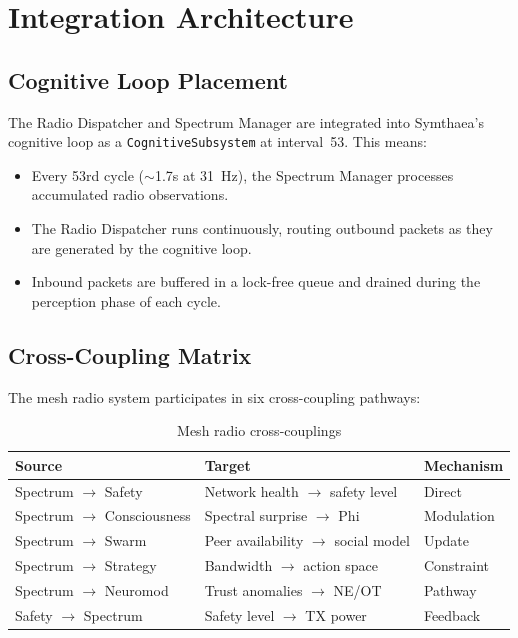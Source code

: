 \documentclass[11pt,twocolumn]{article}
\begin{document}
\section{Integration Architecture}

\subsection{Cognitive Loop Placement}

The Radio Dispatcher and Spectrum Manager are integrated into Symthaea's
cognitive loop as a \texttt{CognitiveSubsystem} at interval~53. This
means:

\begin{itemize}[nosep]
  \item Every 53rd cycle ($\sim$1.7s at 31~Hz), the Spectrum Manager
    processes accumulated radio observations.
  \item The Radio Dispatcher runs continuously, routing outbound packets
    as they are generated by the cognitive loop.
  \item Inbound packets are buffered in a lock-free queue and drained
    during the perception phase of each cycle.
\end{itemize}

\subsection{Cross-Coupling Matrix}

The mesh radio system participates in six cross-coupling pathways:

\begin{table}[H]
\centering
\caption{Mesh radio cross-couplings}
\label{tab:couplings}
\scriptsize
\begin{tabular}{@{}lll@{}}
\toprule
\textbf{Source} & \textbf{Target} & \textbf{Mechanism} \\
\midrule
Spectrum $\rightarrow$ Safety & Network health $\rightarrow$ safety level & Direct \\
Spectrum $\rightarrow$ Consciousness & Spectral surprise $\rightarrow$ Phi & Modulation \\
Spectrum $\rightarrow$ Swarm & Peer availability $\rightarrow$ social model & Update \\
Spectrum $\rightarrow$ Strategy & Bandwidth $\rightarrow$ action space & Constraint \\
Spectrum $\rightarrow$ Neuromod & Trust anomalies $\rightarrow$ NE/OT & Pathway \\
Safety $\rightarrow$ Spectrum & Safety level $\rightarrow$ TX power & Feedback \\
\bottomrule
\end{tabular}
\end{table}
\end{document}
